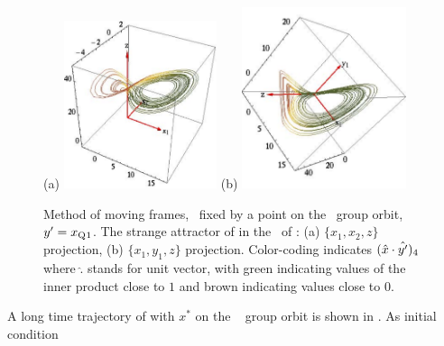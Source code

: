 %
\begin{figure}[ht]
\begin{center}
(a) \includegraphics[width=0.40\textwidth]{../figs/CLEpcSect}
(b) \includegraphics[width=0.43\textwidth]{../figs/CLEpcSect2}
\end{center}
\caption{
Method of moving frames, \slice\ fixed by a point on the
\reqv\ group orbit, ${y'}  = x_{\mathrm{Q}_{}1}$. The strange
attractor of  in the \reducedsp\
of :
(a) $\{x_1,x_2,z\}$ projection,
(b) $\{x_1,y_1,z\}$ projection.
Color-coding indicates $(\hat{x} \cdot \hat{{y'} })_4$
where $\hat{.}$ stands for unit vector, with green indicating values
of the inner product close to $1$ and brown indicating values
close to $0$.
}
\label{fig:CLEpcSect}
\end{figure}
%
A long time trajectory of  with
$x^*$ on the \reqv\  group orbit is shown in
.
As initial condition
